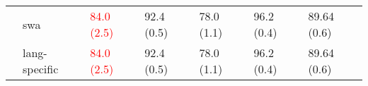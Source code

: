 \begin{tabular}{lllllll}
           & swa &                      \textcolor{red}{84.0 (2.5)} &                      92.4 (0.5) &                                       78.0 (1.1) &                                       96.2 (0.4) &                                       89.64 (0.6) \\
           & lang-specific &                      \textcolor{red}{84.0 (2.5)} &                      92.4 (0.5) &                                       78.0 (1.1) &                                       96.2 (0.4) &                                       89.64 (0.6) \\
\bottomrule
\end{tabular}
